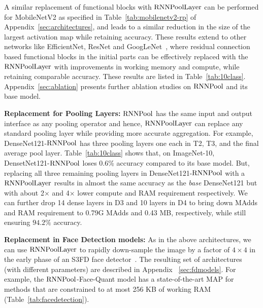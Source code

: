 \documentclass[10pt]{article}
\newcommand{\rpool}{\ensuremath{{\rm RNNPool}}\xspace}
\newcommand{\rpoollayer}{\ensuremath{{\rm RNNPoolLayer}}\xspace}
\begin{document}
A similar replacement of functional blocks with \rpoollayer can be
performed for MobileNetV2 as specified in
Table~\ref{tab:mobilenetv2-rp} of Appendix~\ref{sec:architectures},
and leads to a similar reduction in the size of the largest activation
map while retaining accuracy.  These results extend to other networks
like EfficientNet, ResNet and GoogLeNet~\citep{szegedy2015going},
where residual connection based functional blocks in the initial parts
can be effectively replaced with the \rpoollayer with improvements in
working memory and compute, while retaining comparable accuracy. These
results are listed in
Table~\ref{tab:10class}. Appendix~\ref{sec:ablation} presents further
ablation studies on \rpool and its base model.


\textbf{Replacement for Pooling Layers:} \rpool has the same input and
output interface as any pooling operator and hence, \rpoollayer can
replace any standard pooling layer while providing more accurate
aggregation.  For example, DenseNet121-\rpool has three pooling layers
one each in T2, T3, and the final average pool layer.
Table~\ref{tab:10class} shows that, on ImageNet-10,
DensetNet121-\rpool loses 0.6\% accuracy compared to its base
model. But, replacing all three remaining pooling layers in
DenseNet121-\rpool with a \rpoollayer results in almost the same accuracy
as the {\em base} DenseNet121 but with about 2$\times$ and 4$\times$
lower compute and RAM requirement respectively.  We can further drop
14 dense layers in D3 and 10 layers in D4 to bring down MAdds and RAM
requirement to 0.79G MAdds and 0.43 MB, respectively, while still
ensuring $94.2\%$ accuracy.

\label{sec:introface}
\textbf{Replacement in Face Detection models:} As in the above
architectures, we can use \rpoollayer to rapidly down-sample the image
by a factor of $4\times 4$ in the early phase of an S3FD face
detector~\citep{zhang2017s3fd}. The resulting set of architectures
(with different parameters) are described in Appendix
~\ref{sec:fdmodels}. For example, the \rpool-Face-Quant model has a
state-of-the-art MAP for methods that are constrained to at most 256
KB of working RAM (Table~\ref{tab:facedetection}).
\end{document}

